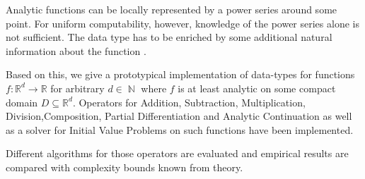 \documentclass{article}
\newcommand{\RR}{\mathbb R}
\DeclareMathOperator{\NN}{\mathbb N}
\begin{document}
Analytic functions can be locally represented by a power series around some point.
For uniform computability, however, knowledge of the power series alone is not sufficient.
The data type has to be enriched by some additional natural information about the function \cite{Mueller95}.

Based on this, we give a prototypical implementation of data-types for functions $f: \RR^d \to \RR$ for arbitrary $d \in \NN$ where $f$ is at least analytic on some compact domain $D \subseteq \RR^d$.
Operators for Addition, Subtraction, Multiplication, Division,Composition, Partial Differentiation and Analytic Continuation as well as a solver for Initial Value Problems on such functions have been implemented.


Different algorithms for those operators are evaluated and empirical results are compared with complexity bounds known from theory. 


{}
\end{document}
